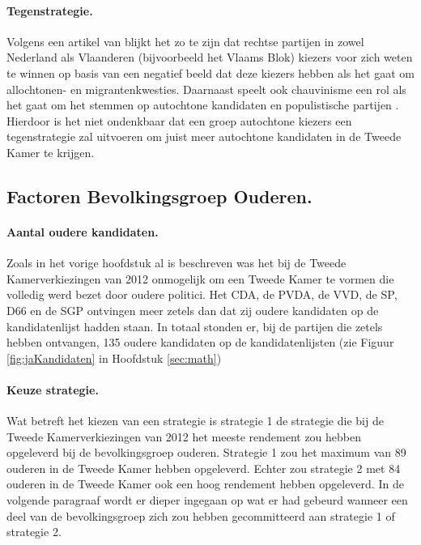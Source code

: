 \paragraph{Tegenstrategie.}
Volgens een artikel van \cite{de2000political} blijkt het zo te zijn dat rechtse partijen in zowel Nederland als Vlaanderen (bijvoorbeeld het Vlaams Blok) kiezers voor zich weten te winnen op basis van een negatief beeld dat deze kiezers hebben als het gaat om allochtonen- en migrantenkwesties. Daarnaast speelt ook chauvinisme een rol als het gaat om het stemmen op autochtone kandidaten en populistische partijen \citep{van2010swaying}. Hierdoor is het niet ondenkbaar dat een groep autochtone kiezers een tegenstrategie zal uitvoeren om juist meer autochtone kandidaten in de Tweede Kamer te krijgen.

\subsection{Factoren Bevolkingsgroep Ouderen.}
\label{percO}

\paragraph{Aantal oudere kandidaten.} 
Zoals in het vorige hoofdstuk al is beschreven was het bij de Tweede Kamerverkiezingen van 2012 onmogelijk om een Tweede Kamer te vormen die volledig werd bezet door oudere politici. Het CDA, de PVDA, de VVD, de SP, D66 en de SGP ontvingen meer zetels dan dat zij oudere kandidaten op de kandidatenlijst hadden staan. In totaal stonden er, bij de partijen die zetels hebben ontvangen, 135 oudere kandidaten op de kandidatenlijsten (zie Figuur \ref{fig:jaKandidaten} in Hoofdstuk \ref{sec:math})

\paragraph{Keuze strategie.}
Wat betreft het kiezen van een strategie is strategie 1 de strategie die bij de Tweede Kamerverkiezingen van 2012 het meeste rendement zou hebben opgeleverd bij de bevolkingsgroep ouderen. Strategie 1 zou het maximum van 89 ouderen in de Tweede Kamer hebben opgeleverd. Echter zou strategie 2 met 84 ouderen in de Tweede Kamer ook een hoog rendement hebben opgeleverd. In de volgende paragraaf wordt er dieper ingegaan op wat er had gebeurd wanneer een deel van de bevolkingsgroep zich zou hebben gecommitteerd aan strategie 1 of strategie 2.

